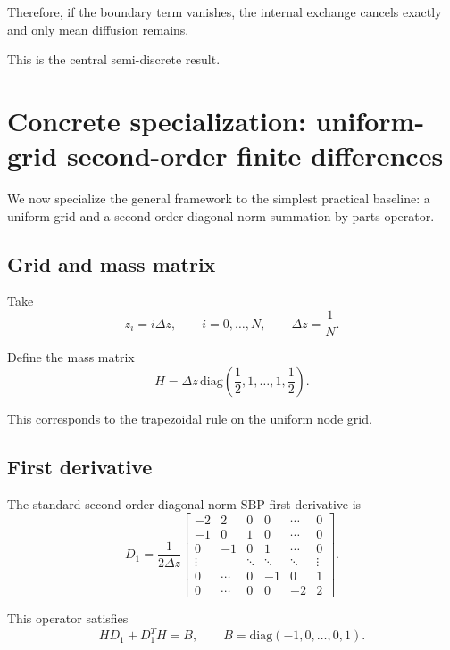 \documentclass[11pt]{article}
\begin{document}
Therefore, if the boundary term vanishes, the internal exchange cancels exactly and only mean diffusion remains.

This is the central semi-discrete result.

\section{Concrete specialization: uniform-grid second-order finite differences}

We now specialize the general framework to the simplest practical baseline: a uniform grid and a second-order diagonal-norm summation-by-parts operator.

\subsection{Grid and mass matrix}

Take
\[
z_i = i\Delta z,
\qquad i=0,\dots,N,
\qquad
\Delta z = \frac{1}{N}.
\]

Define the mass matrix
\begin{equation}
H
=
\Delta z\,
\mathrm{diag}\!\left(\frac12,1,\dots,1,\frac12\right).
\label{eq:H-sbp2}
\end{equation}

This corresponds to the trapezoidal rule on the uniform node grid.

\subsection{First derivative}

The standard second-order diagonal-norm SBP first derivative is
\begin{equation}
D_1
=
\frac{1}{2\Delta z}
\begin{bmatrix}
-2 & 2 & 0 & 0 & \cdots & 0 \\
-1 & 0 & 1 & 0 & \cdots & 0 \\
0 & -1 & 0 & 1 & \cdots & 0 \\
\vdots & & \ddots & \ddots & \ddots & \vdots \\
0 & \cdots & 0 & -1 & 0 & 1 \\
0 & \cdots & 0 & 0 & -2 & 2
\end{bmatrix}.
\label{eq:D1-sbp2}
\end{equation}

This operator satisfies
\begin{equation}
H D_1 + D_1^T H = B,
\qquad
B = \mathrm{diag}(-1,0,\dots,0,1).
\label{eq:sbp-identity}
\end{equation}
\end{document}
